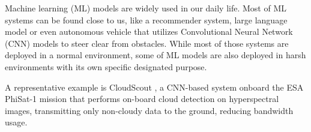 \noindent



Machine learning (ML) models are widely used in our daily life. Most of ML systems can be found close to us, like a recommender system, large language model or even autonomous vehicle that utilizes Convolutional Neural Network (CNN) models to steer clear from obstacles. While most of those systems are deployed in a normal environment, some of ML models are also deployed in harsh environments with its own specific designated purpose. 


A representative example is CloudScout \cite{Giuffrida2020-ry}, a CNN-based system onboard the ESA PhiSat-1 mission that performs on-board cloud detection on hyperspectral images, transmitting only non-cloudy data to the ground, reducing bandwidth usage.

